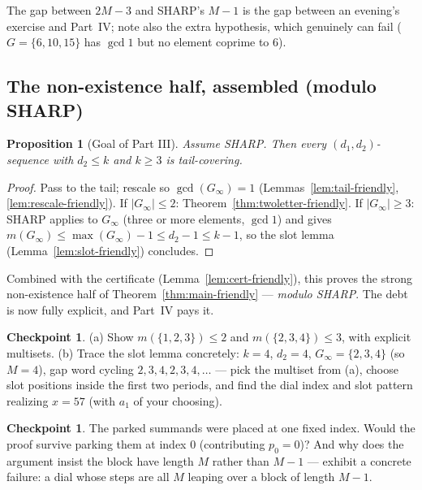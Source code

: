 \documentclass[11pt,reqno]{amsart}
\theoremstyle{plain}
\newtheorem{proposition}[theorem]{Proposition}
\theoremstyle{definition}
\newtheorem{checkpoint}[theorem]{Checkpoint}   %
\theoremstyle{remark}
\newcommand{\Ginf}{G_\infty}
\begin{document}
The gap between $2M - 3$ and SHARP's $M - 1$ is the gap between an evening's
exercise and Part~IV; note also the extra hypothesis, which genuinely can fail
($G = \{6, 10, 15\}$ has $\gcd 1$ but no element coprime to $6$).

\subsection{The non-existence half, assembled (modulo SHARP)}

\begin{proposition}[Goal of Part III]\label{prop:goal}
Assume SHARP. Then every $(d_1,d_2)$-sequence with $d_2 \le k$ and $k \ge 3$ is
tail-covering.
\end{proposition}

\begin{proof}
Pass to the tail; rescale so $\gcd(\Ginf) = 1$ (Lemmas~\ref{lem:tail-friendly},
\ref{lem:rescale-friendly}). If $|\Ginf| \le 2$:
Theorem~\ref{thm:twoletter-friendly}. If $|\Ginf| \ge 3$: SHARP applies to
$\Ginf$ (three or more elements, $\gcd 1$) and gives $m(\Ginf) \le \max(\Ginf) - 1
\le d_2 - 1 \le k - 1$, so the slot lemma (Lemma~\ref{lem:slot-friendly})
concludes.
\end{proof}

Combined with the certificate (Lemma~\ref{lem:cert-friendly}), this proves the
strong non-existence half of Theorem~\ref{thm:main-friendly} --- \emph{modulo
SHARP}. The debt is now fully explicit, and Part~IV pays it.

\begin{checkpoint}
(a) Show $m(\{1, 2, 3\}) \le 2$ and $m(\{2, 3, 4\}) \le 3$, with explicit
multisets. (b) Trace the slot lemma concretely: $k = 4$, $d_2 = 4$, $\Ginf =
\{2, 3, 4\}$ (so $M = 4$), gap word cycling $2, 3, 4, 2, 3, 4, \dots$ --- pick the multiset from (a), choose slot positions inside the first two
periods, and find the dial index and slot pattern realizing $x = 57$ (with $a_1$
of your choosing).
\end{checkpoint}

\begin{checkpoint}
The parked summands were placed at one fixed index. Would the proof survive
parking them at index $0$ (contributing $p_0 = 0$)? And why does the argument
insist the block have length $M$ rather than $M - 1$ --- exhibit a concrete
failure: a dial whose steps are all $M$ leaping over a block of length $M-1$.
\end{checkpoint}
\end{document}
